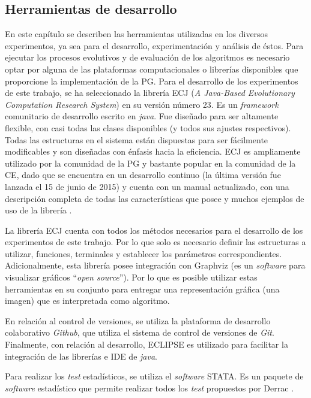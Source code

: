 \subsection{Herramientas de desarrollo}

En este capítulo se describen las herramientas utilizadas en los diversos experimentos, ya sea para el desarrollo, experimentación y análisis de éstos.
Para ejecutar los procesos evolutivos y de evaluación de los algoritmos es necesario optar por alguna de las plataformas computacionales o librerías disponibles que proporcione la implementación de la PG. Para el desarrollo de los experimentos de este trabajo, se ha seleccionado la librería ECJ (\textit{A Java-Based Evolutionary Computation Research System}) en su versión número 23. Es un \textit{framework} comunitario de desarrollo escrito en \textit{java}. Fue diseñado para ser altamente flexible, con casi todas las clases disponibles (y todos sus ajustes respectivos). Todas las estructuras en el sistema están dispuestas para ser fácilmente modificables y son diseñadas con énfasis hacia la eficiencia. ECJ es ampliamente utilizado por la comunidad de la PG y bastante popular en la comunidad de la CE, dado que se encuentra en un desarrollo continuo (la última versión fue lanzada el 15 de junio de 2015) y cuenta con un manual actualizado, con una descripción completa de todas las características que posee y muchos ejemplos de uso de la librería \citep{luke_2015}.

La librería ECJ cuenta con todos los métodos necesarios para el desarrollo de los experimentos de este trabajo. Por lo que solo es necesario definir las estructuras a utilizar, funciones, terminales y establecer los parámetros correspondientes. Adicionalmente, esta librería posee integración con Graphviz (es un \textit{software} para visualizar gráficos “\textit{open source}”). Por lo que es posible utilizar estas herramientas en su conjunto para entregar una representación gráfica (una imagen) que es interpretada como algoritmo.

En relación al control de versiones, se utiliza la plataforma de desarrollo colaborativo \textit{Github}, que utiliza el sistema de control de versiones de \textit{Git}. Finalmente, con relación al desarrollo, ECLIPSE es utilizado para facilitar la integración de las librerías e IDE de \textit{java}.

Para realizar los \textit{test} estadísticos, se utiliza el \textit{software} STATA. Es un paquete de \textit{software} estadístico que permite realizar todos los \textit{test} propuestos por Derrac \citep{derrac_2011}.

